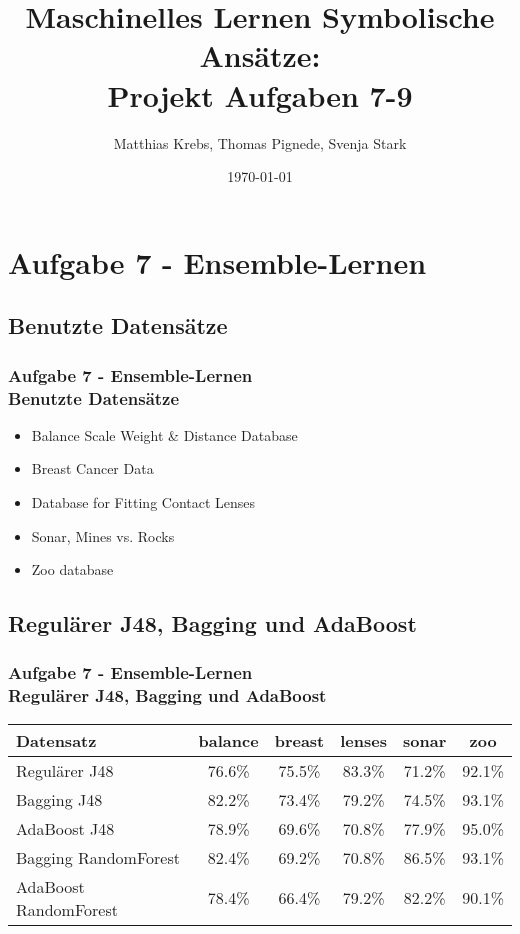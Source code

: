 \documentclass[accentcolor=tud10b,colorbacktitle,inverttitle,landscape,german,presentation,t]{tudbeamer}
\begin{document}
\title[MLDM: Projekt Aufg 7-9]{Maschinelles Lernen Symbolische Ansätze:\\ Projekt Aufgaben 7-9}
\subtitle{}

\author[krebs\_pignede\_stark]{Matthias Krebs, Thomas Pignede, Svenja Stark}

\date{\today}

\begin{titleframe}
\tableofcontents
\end{titleframe}

    \section{Aufgabe 7 - Ensemble-Lernen}
    
    \subsection{Benutzte Datensätze}
    
    \begin{frame}[t]
    \frametitle{Aufgabe 7 - Ensemble-Lernen\\ Benutzte Datensätze}
        \begin{itemize}
            \item Balance Scale Weight \& Distance Database
            \item Breast Cancer Data
            \item Database for Fitting Contact Lenses
            \item Sonar, Mines vs. Rocks
            \item Zoo database
        \end{itemize}
    \end{frame}
    
    \subsection{Regulärer J48, Bagging und AdaBoost}
    
    \begin{frame}[t]
    \frametitle{Aufgabe 7 - Ensemble-Lernen\\ Regulärer J48, Bagging und AdaBoost}
        \begin{tabular}[htbp]{l||c|c|c|c|c}
            Datensatz & balance & breast & lenses & sonar & zoo \\
            \hline
            \hline
            Regulärer J48 & 76.6\% & 75.5\% & 83.3\% & 71.2\% & 92.1\% \\
            \hline
            Bagging J48 & 82.2\% & 73.4\% & 79.2\% & 74.5\% & 93.1\% \\
            \hline
            AdaBoost J48 & 78.9\% & 69.6\% & 70.8\% & 77.9\% & 95.0\% \\
            \hline
            Bagging RandomForest & 82.4\% & 69.2\% & 70.8\% & 86.5\% & 93.1\% \\
            \hline
            AdaBoost RandomForest & 78.4\% & 66.4\% & 79.2\% & 82.2\% & 90.1\%
        \end{tabular}
    \end{frame}
    
\end{document}
